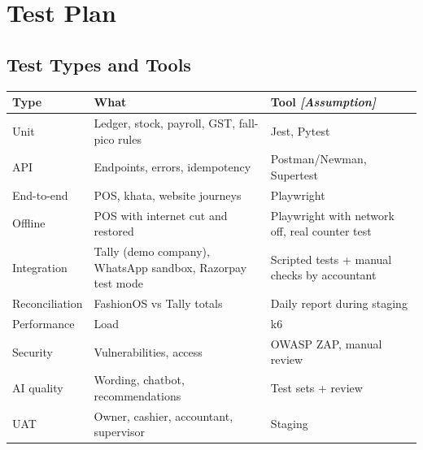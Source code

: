 \documentclass[11pt,a4paper]{article}
\newcommand{\assump}{\textit{[Assumption]}}
\newcommand{\hdr}{\rowcolor{hdrgray}\bfseries}
\begin{document}
\section{Test Plan}
\subsection{Test Types and Tools}
\begin{longtable}{L{3cm}L{6.5cm}L{7cm}}
\hdr Type & What & Tool \assump \\ \endhead
Unit & Ledger, stock, payroll, GST, fall-pico rules & Jest, Pytest \\
API & Endpoints, errors, idempotency & Postman/Newman, Supertest \\
End-to-end & POS, khata, website journeys & Playwright \\
Offline & POS with internet cut and restored & Playwright with network off, real counter test \\
Integration & Tally (demo company), WhatsApp sandbox, Razorpay test mode & Scripted tests + manual checks by accountant \\
Reconciliation & FashionOS vs Tally totals & Daily report during staging \\
Performance & Load & k6 \\
Security & Vulnerabilities, access & OWASP ZAP, manual review \\
AI quality & Wording, chatbot, recommendations & Test sets + review \\
UAT & Owner, cashier, accountant, supervisor & Staging \\
\end{longtable}
\end{document}
